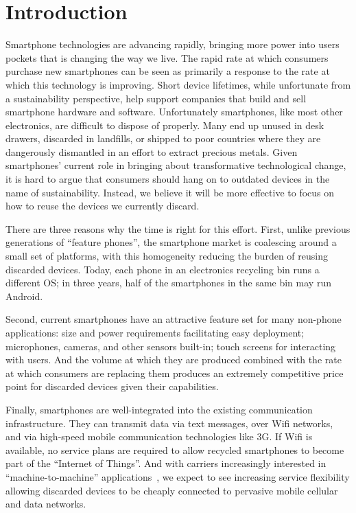 \section{Introduction}

Smartphone technologies are advancing rapidly, bringing more power into users
pockets that is changing the way we live. The rapid rate at which consumers
purchase new smartphones can be seen as primarily a response to the rate at
which this technology is improving. Short device lifetimes, while unfortunate
from a sustainability perspective, help support companies that build and sell
smartphone hardware and software. Unfortunately smartphones, like most other
electronics, are difficult to dispose of properly. Many end up unused in desk
drawers, discarded in landfills, or shipped to poor countries where they are
dangerously dismantled in an effort to extract precious metals. Given
smartphones' current role in bringing about transformative technological
change, it is hard to argue that consumers should hang on to outdated devices
in the name of sustainability. Instead, we believe it will be more effective
to focus on how to reuse the devices we currently discard.

There are three reasons why the time is right for this effort. First, unlike
previous generations of ``feature phones'', the smartphone market is
coalescing around a small set of platforms, with this homogeneity reducing
the burden of reusing discarded devices. Today, each phone in an electronics
recycling bin runs a different OS; in three years, half of the smartphones in
the same bin may run Android.

Second, current smartphones have an attractive feature set for many non-phone
applications: size and power requirements facilitating easy deployment;
microphones, cameras, and other sensors built-in; touch screens for
interacting with users. And the volume at which they are produced combined
with the rate at which consumers are replacing them produces an extremely
competitive price point for discarded devices given their capabilities.

Finally, smartphones are well-integrated into the existing communication
infrastructure. They can transmit data via text messages, over Wifi networks,
and via high-speed mobile communication technologies like 3G. If Wifi is
available, no service plans are required to allow recycled smartphones to
become part of the ``Internet of Things''. And with carriers increasingly
interested in ``machine-to-machine'' applications~\cite{sprint-m2m}, we
expect to see increasing service flexibility allowing discarded devices to be
cheaply connected to pervasive mobile cellular and data networks.

